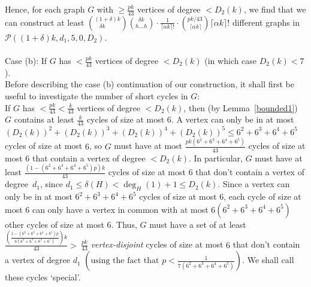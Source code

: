 \documentclass{article}
\newtheorem{Proof of Theorem}{Proof of Theorem}
\begin{document}
Hence, for each graph $G$ with $\geq \frac{pk}{43}$ vertices of degree $<D_{2}(k)$,
we find that we can construct at least
$
\left(^{(1+\delta)k} _{\phantom{qq} \delta k} \right)
\left(^{\phantom{p}\delta k}_{h \ldots h} \right) 
\cdot \frac{1}{\lceil \alpha k \rceil !} \cdot \left( ^{pk/43}_{\phantom{i} \lceil \alpha k \rceil} \right)
\lceil \alpha k \rceil !
$
different graphs in $\mathcal{P}((1+\delta)k,d_{1},5,0,D_{2})$. \\
\\
Case (b): If $G$ has $<\frac{pk}{43}$ vertices of degree $<D_{2}(k)$
(in which case $D_{2}(k)<7$). \\
Before describing the case (b) continuation of our construction,
it shall first be useful to investigate the number of short cycles in $G$: \\
If $G$ has $<\frac{pk}{43} < \frac{k}{43}$ vertices of degree $<D_{2}(k)$,
then (by Lemma~\ref{bounded1}) $G$ contains at least $\frac{k}{43}$ cycles of size at most $6$.
A vertex can only be in at most 
$(D_{2}(k))^{2}+(D_{2}(k))^{3}+(D_{2}(k))^{4}+(D_{2}(k))^{5} \leq 6^{2}+6^{3}+6^{4}+6^{5}$ cycles of size at most $6$,
so $G$ must have at most $\frac{pk(6^{2}+6^{3}+6^{4}+6^{5})}{43}$ cycles of size at most $6$
that contain a vertex of degree $<D_{2}(k)$.
In particular, $G$ must have at least $\frac{(1-(6^{2}+6^{3}+6^{4}+6^{5})p)k}{43}$ cycles of size at most $6$
that don't contain a vertex of degree~$d_{1}$, since $d_{1} \leq \delta(H) < \deg_{H}(1)+1 \leq D_{2}(k)$.
Since a vertex can only be in at most 
$6^{2}+6^{3}+6^{4}+6^{5}$ cycles of size at most $6$,
each cycle of size at most $6$ can only have a vertex in common with
at most $6(6^{2}+6^{3}+6^{4}+6^{5})$ other cycles of size at most $6$.
Thus, $G$ must have a set of at least 
$\frac{\left( \frac{1-(6^{2}+6^{3}+6^{4}+6^{5})p}{6(6^{2}+6^{3}+6^{4}+6^{5})} \right)k}{43} >~\frac{pk}{43}$ 
\textit{vertex-disjoint} cycles of size at most $6$ that don't contain a vertex of degree $d_{1}$
$\left( \textrm{using the fact that } 
p < \frac{1}{7(6^{2}+6^{3}+6^{4}+6^{5})} \right)$.
We shall call these cycles `special'.
\end{document}
